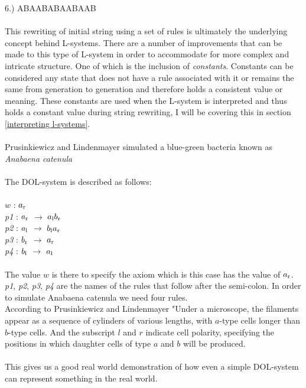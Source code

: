 6.) ABAABABAABAAB \\
\\
This rewriting of initial string using a set of rules is ultimately the underlying concept behind L-systems. There are a number of improvements that can be made to this type of L-system in order to accommodate for more complex and intricate structure. One of which is the inclusion of \textit{constants}. Constants can be considered any state that does not have a rule associated with it or remains the same from generation to generation and therefore holds a consistent value or meaning. These constants are used when the L-system is interpreted and thus holds a constant value during string rewriting, I will be covering this in section \ref{interpreting l-systems}. \\
\\
Prusinkiewicz and Lindenmayer simulated a blue-green bacteria known as \textit{Anabaena catenula} \cite{prusinkiewicz2012algorithmic}\\
\\
The DOL-system is described as follows: \\
\\
$w$ : $ a\textsubscript{r} $\\
\textit{p1} : $ a\textsubscript{r} $ $\rightarrow$ $a\textsubscript{l}b\textsubscript{r}$ \\
\textit{p2} : $ a\textsubscript{l} $ $\rightarrow$ $b\textsubscript{l}a\textsubscript{r}$ \\
\textit{p3} : $ b\textsubscript{r} $ $\rightarrow$ $a\textsubscript{r}$ \\
\textit{p4} : $ b\textsubscript{l} $ $\rightarrow$ $a\textsubscript{l}$ \\
\\
The value $w$ is there to specify the axiom which is this case has the value of $ a\textsubscript{r} $. \textit{p1}, \textit{p2}, \textit{p3}, \textit{p4} are the names of the rules that follow after the semi-colon. In order to simulate Anabaena catenula we need four rules. \\
According to Prusinkiewicz and Lindenmayer "Under a microscope, the filaments appear as a sequence of cylinders of various lengths, with $a$-type cells longer than $b$-type cells. And the subscript $l$ and $r$ indicate cell polarity, specifying the positions in which daughter cells of type $a$ and $b$ will be produced. \cite{prusinkiewicz2012algorithmic} \\
\\ 
This gives us a good real world demonstration of how even a simple DOL-system can represent something in the real world. 


